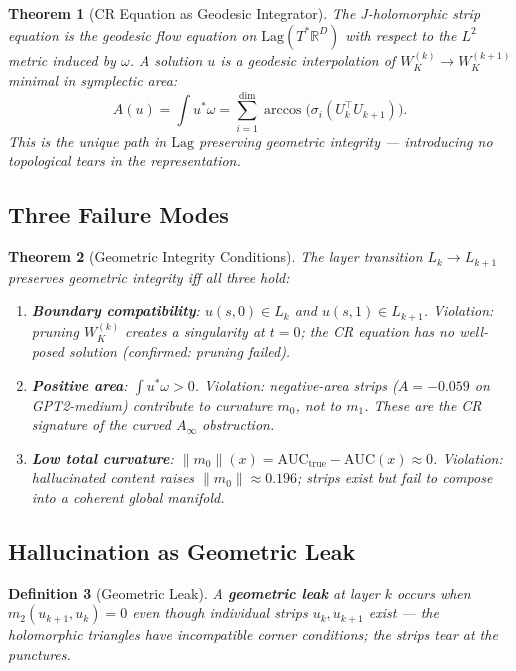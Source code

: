 \documentclass[11pt]{amsart}
\newtheorem{theorem}{Theorem}[section]
\newtheorem{definition}[theorem]{Definition}
\begin{document}
\begin{theorem}[CR Equation as Geodesic Integrator]
\label{thm:cr_geodesic}
The J-holomorphic strip equation is the geodesic flow equation
on $\mathrm{Lag}(T^*\mathbb{R}^D)$ with respect to the $L^2$ metric
induced by $\omega$.
A solution $u$ is a geodesic interpolation of $W_K^{(k)}\to W_K^{(k+1)}$
minimal in symplectic area:
\[
  A(u) = \int u^*\omega
  = \sum_{i=1}^{\mathrm{dim}} \arccos\bigl(\sigma_i(U_k^\top U_{k+1})\bigr).
\]
This is the unique path in $\mathrm{Lag}$ preserving geometric
integrity --- introducing no topological tears in the representation.
\end{theorem}

\subsection{Three Failure Modes}

\begin{theorem}[Geometric Integrity Conditions]
\label{thm:integrity}
The layer transition $L_k\to L_{k+1}$ preserves geometric integrity
iff all three hold:
\begin{enumerate}
\item[\textup{(I)}] \textbf{Boundary compatibility}:
  $u(s,0)\in L_k$ and $u(s,1)\in L_{k+1}$.
  \emph{Violation}: pruning $W_K^{(k)}$ creates a singularity at $t=0$;
  the CR equation has no well-posed solution (confirmed: pruning failed).
\item[\textup{(II)}] \textbf{Positive area}: $\int u^*\omega>0$.
  \emph{Violation}: negative-area strips ($A=-0.059$ on GPT2-medium)
  contribute to curvature $m_0$, not to $m_1$.
  These are the CR signature of the curved $A_\infty$ obstruction.
\item[\textup{(III)}] \textbf{Low total curvature}:
  $\|m_0\|(x)=\mathrm{AUC}_{\mathrm{true}}-\mathrm{AUC}(x)\approx 0$.
  \emph{Violation}: hallucinated content raises $\|m_0\|\approx 0.196$;
  strips exist but fail to compose into a coherent global manifold.
\end{enumerate}
\end{theorem}

\subsection{Hallucination as Geometric Leak}

\begin{definition}[Geometric Leak]
A \textbf{geometric leak} at layer $k$ occurs when
$m_2(u_{k+1},u_k)=0$ even though individual strips $u_k,u_{k+1}$ exist
--- the holomorphic triangles have incompatible corner conditions;
the strips tear at the punctures.
\end{definition}
\end{document}
